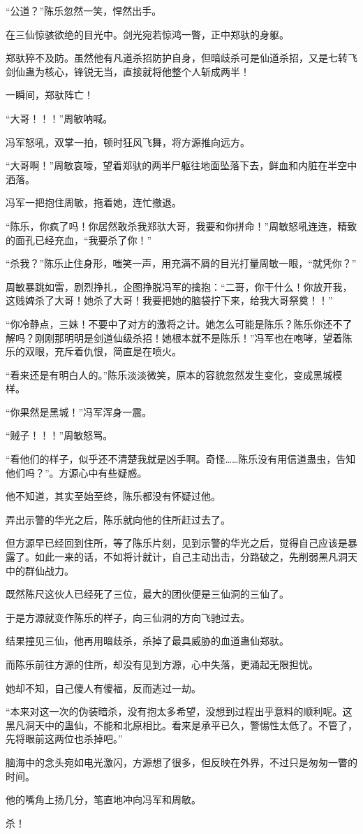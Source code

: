 \begin{this_body}
“公道？”陈乐忽然一笑，悍然出手。

在三仙惊骇欲绝的目光中。剑光宛若惊鸿一瞥，正中郑驮的身躯。

郑驮猝不及防。虽然他有凡道杀招防护自身，但暗歧杀可是仙道杀招，又是七转飞剑仙蛊为核心，锋锐无当，直接就将他整个人斩成两半！

一瞬间，郑驮阵亡！

“大哥！！！”周敏呐喊。

冯军怒吼，双掌一拍，顿时狂风飞舞，将方源推向远方。

“大哥啊！”周敏哀嚎，望着郑驮的两半尸躯往地面坠落下去，鲜血和内脏在半空中洒落。

冯军一把抱住周敏，拖着她，连忙撤退。

“陈乐，你疯了吗！你居然敢杀我郑驮大哥，我要和你拼命！”周敏怒吼连连，精致的面孔已经充血，“我要杀了你！”

“杀我？”陈乐止住身形，嗤笑一声，用充满不屑的目光打量周敏一眼，“就凭你？”

周敏暴跳如雷，剧烈挣扎，企图挣脱冯军的擒抱：“二哥，你干什么！你放开我，这贱婢杀了大哥！她杀了大哥！我要把她的脑袋拧下来，给我大哥祭奠！！”

“你冷静点，三妹！不要中了对方的激将之计。她怎么可能是陈乐？陈乐你还不了解吗？刚刚那明明是剑道仙级杀招！她根本就不是陈乐！”冯军也在咆哮，望着陈乐的双眼，充斥着仇恨，简直是在喷火。

“看来还是有明白人的。”陈乐淡淡微笑，原本的容貌忽然发生变化，变成黑城模样。

“你果然是黑城！”冯军浑身一震。

“贼子！！！”周敏怒骂。

“看他们的样子，似乎还不清楚我就是凶手啊。奇怪……陈乐没有用信道蛊虫，告知他们吗？”。方源心中有些疑惑。

他不知道，其实至始至终，陈乐都没有怀疑过他。

弄出示警的华光之后，陈乐就向他的住所赶过去了。

但方源早已经回到住所，等了陈乐片刻，见到示警的华光之后，觉得自己应该是暴露了。如此一来的话，不如将计就计，自己主动出击，分路破之，先削弱黑凡洞天中的群仙战力。

既然陈尺这伙人已经死了三位，最大的团伙便是三仙洞的三仙了。

于是方源就变作陈乐的样子，向三仙洞的方向飞驰过去。

结果撞见三仙，他再用暗歧杀，杀掉了最具威胁的血道蛊仙郑驮。

而陈乐前往方源的住所，却没有见到方源，心中失落，更涌起无限担忧。

她却不知，自己傻人有傻福，反而逃过一劫。

“本来对这一次的伪装暗杀，没有抱太多希望，没想到过程出乎意料的顺利呢。这黑凡洞天中的蛊仙，不能和北原相比。看来是承平已久，警惕性太低了。不管了，先将眼前这两位也杀掉吧。”

脑海中的念头宛如电光激闪，方源想了很多，但反映在外界，不过只是匆匆一瞥的时间。

他的嘴角上扬几分，笔直地冲向冯军和周敏。

杀！

\end{this_body}

